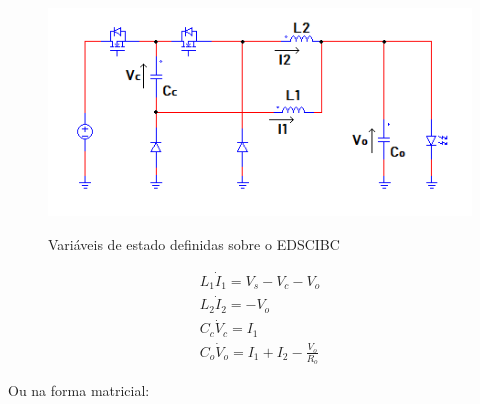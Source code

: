 \documentclass[
        12pt,
        openany, %
        oneside, %
        a4paper,			
        english,			
        brazil
        ]{abntbibufjf}
\begin{document}
\begin{figure}[!h]
	\centering
	\caption{Variáveis de estado definidas sobre o EDSCIBC}
	\includegraphics[scale=.8]{../ESQUEMAS/ss_var.PNG}\\
	\label{ss_var}
\end{figure}



\begin{equation}
\begin{array}{cc}
L_1 \dot{I}_1 = V_s - V_c - V_o\\
L_2 \dot{I}_2 = - V_o\\
C_c \dot{V}_c = I_1\\
C_o \dot{V}_o = I_1+I_2-\frac{V_o}{R_o}
\end{array}
\end{equation}

Ou na forma matricial:
\end{document}
